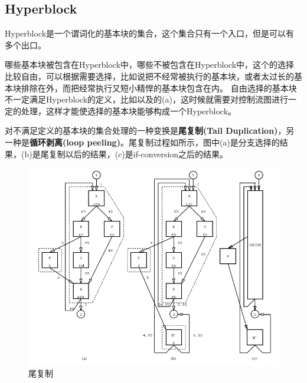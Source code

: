 \subsection{Hyperblock}

\begin{definition}[Hyperblock]
Hyperblock是一个谓词化的基本块的集合，这个集合只有一个入口，但是可以有多个出口。
\end{definition}

哪些基本块被包含在Hyperblock中，哪些不被包含在Hyperblock中，这个的选择比较自由，可以根据需要选择，比如说把不经常被执行的基本块，或者太过长的基本块排除在外，而把经常执行又短小精悍的基本块包含在内。
自由选择的基本块不一定满足Hyperblock的定义，比如以及的(a)，这时候就需要对控制流图进行一定的处理，这样才能使选择的基本块能够构成一个Hyperblock。

对不满足定义的基本块的集合处理的一种变换是\textbf{尾复制(Tail Duplication)}，另一种是\textbf{循环剥离(loop peeling)}。尾复制过程如所示，图中(a)是分支选择的结果，(b)是尾复制以后的结果，(c)是if-conversion之后的结果。
\begin{figure}
\includegraphics[width=\linewidth]{mechanism/hyperblock-td}
\caption{\label{fig:taildup} 尾复制}
\end{figure}

